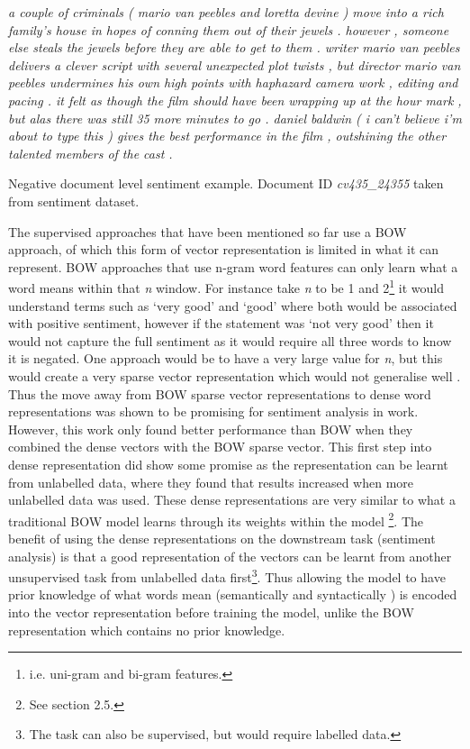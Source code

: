 \begin{example}
\setlength{\parindent}{17pt}
\indent\textit{a couple of criminals ( mario van peebles and loretta devine ) move into a rich family's house in hopes of conning them out of their jewels . however , someone else steals the jewels before they are able to get to them . writer mario van peebles delivers a clever script with several unexpected plot twists , but director mario van peebles undermines his own high points with haphazard camera work , editing and pacing . it felt as though the film should have been wrapping up at the hour mark , but alas there was still 35 more minutes to go . daniel baldwin ( i can't believe i'm about to type this ) gives the best performance in the film , outshining the other talented members of the cast .}
\caption{Negative document level sentiment example. Document ID \textit{cv435\_24355} taken from \citet{pang-etal-2002-thumbs} sentiment dataset.}
\label{example:lit_review_document_sentiment}
\end{example}

The supervised approaches that have been mentioned so far use a BOW approach, of which this form of vector representation is limited in what it can represent. BOW approaches that use n-gram word features can only learn what a word means within that \textit{n} window. For instance take \textit{n} to be 1 and 2\footnote{i.e. uni-gram and bi-gram features.} it would understand terms such as `very good' and `good' where both would be associated with positive sentiment, however if the statement was `not very good' then it would not capture the full sentiment as it would require all three words to know it is negated. One approach would be to have a very large value for \textit{n}, but this would create a very sparse vector representation which would not generalise well \citep{le2014distributed}. Thus the move away from BOW sparse vector representations to dense word representations was shown to be promising for sentiment analysis in \citet{maas-etal-2011-learning} work. However, this work only found better performance than BOW when they combined the dense vectors with the BOW sparse vector. This first step into dense representation did show some promise as the representation can be learnt from unlabelled data, where they found that results increased when more unlabelled data was used. These dense representations are very similar to what a traditional BOW model learns through its weights within the model \citep{goldberg2017neural}\footnote{See section 2.5.}. The benefit of using the dense representations on the downstream task (sentiment analysis) is that a good representation of the vectors can be learnt from another unsupervised task from unlabelled data first\footnote{The task can also be supervised, but would require labelled data.}. Thus allowing the model to have prior knowledge of what words mean (semantically and syntactically \citep{mikolov2013efficient}) is encoded into the vector representation before training the model, unlike the BOW representation which contains no prior knowledge. 

